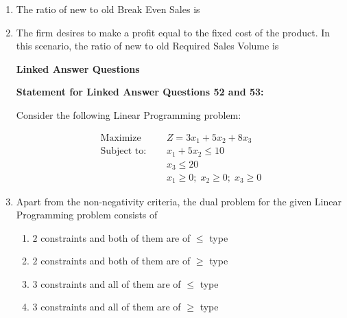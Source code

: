 \documentclass[journal,12pt,onecolumn]{IEEEtran}
\theoremstyle{remark}
\begin{document}
\begin{enumerate}
\item The ratio of new to old Break Even Sales is
\hfill{}
\begin{enumerate}
\end{enumerate}

\item The firm desires to make a profit equal to the fixed cost of the product. In this scenario, the ratio of new to old Required Sales Volume is
\hfill{}
\begin{enumerate}
\end{enumerate}
\noindent 
\textbf{Linked Answer Questions}

\vspace{1em} %

\noindent 
\textbf{Statement for Linked Answer Questions 52 and 53:}

\vspace{1em}

\noindent 
Consider the following Linear Programming problem:

\begin{align*}
    \text{Maximize } \quad & Z = 3x_1 + 5x_2 + 8x_3 \\
    \text{Subject to: } \quad & x_1 + 5x_2 \leq 10 \\
    & x_3 \leq 20 \\
    & x_1 \geq 0; \; x_2 \geq 0; \; x_3 \geq 0
\end{align*}

\item Apart from the non-negativity criteria, the dual problem for the given Linear Programming problem consists of
\hfill{}
\begin{enumerate}
\item $2$ constraints and both of them are of $\le$ type
\item $2$ constraints and both of them are of $\ge$ type
\item $3$ constraints and all of them are of $\le$ type
\item $3$ constraints and all of them are of $\ge$ type
\end{enumerate}


\end{enumerate}
\end{document}
